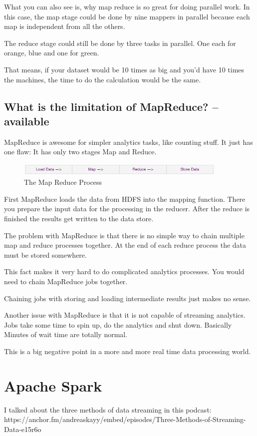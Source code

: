\documentclass[12pt, numbers=noenddot]{scrreprt} %
\begin{document}
What you can also see is, why map reduce is so great for doing parallel work. In this case, the map stage could be done by nine mappers in parallel because each map is independent from all the others.

The reduce stage could still be done by three tasks in parallel. One each for orange, blue and one for green.

That means, if your dataset would be 10 times as big and you’d have 10 times the machines, the time to do the calculation would be the same.

\subsection{What is the limitation of MapReduce? -- available}
MapReduce is awesome for simpler analytics tasks, like counting stuff. It just has one flaw: It has only two stages Map and Reduce.

\begin{figure}[htbp]
  \centering
     \includegraphics[width=0.9\textwidth]{images/MapReduce-Process}
  \caption{The Map Reduce Process}
  \label{fig:Bild1}
\end{figure}

First MapReduce loads the data from HDFS into the mapping function. There you prepare the input data for the processing in the reducer. After the reduce is finished the results get written to the data store.

The problem with MapReduce is that there is no simple way to chain multiple map and reduce processes together. At the end of each reduce process the data must be stored somewhere.

This fact makes it very hard to do complicated analytics processes. You would need to chain MapReduce jobs together.

Chaining jobs with storing and loading intermediate results just makes no sense.

Another issue with MapReduce is that it is not capable of streaming analytics. Jobs take some time to spin up, do the analytics and shut down. Basically Minutes of wait time are totally normal.

This is a big negative point in a more and more real time data processing world.



\section{Apache Spark}
I talked about the three methods of data streaming in this podcast: https://anchor.fm/andreaskayy/embed/episodes/Three-Methods-of-Streaming-Data-e15r6o
\end{document}
